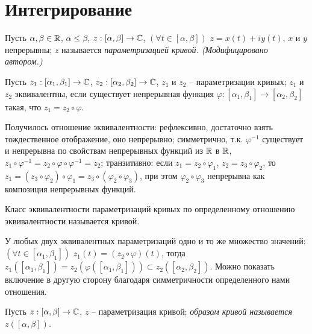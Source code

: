 
\section{Интегрирование}

\begin{definition}
	Пусть $\alpha, \beta \in \mathbb{R}$, $\alpha \leq \beta$, $z: [\alpha, \beta] \to \mathbb{C}$, $(\forall t \in [\alpha, \beta]) \,\, z = x(t) + i y(t)$, $x$ и $y$ непрерывны; $z$ называется \it{параметризацией кривой}. (Модифицировано автором.)
\end{definition}

\begin{definition}
	Пусть $z_1: [\alpha_1, \beta_1] \to \mathbb{C}$, $z_2: [\alpha_2, \beta_2] \to \mathbb{C}$, $z_1$ и $z_2$ -- параметризации кривых; $z_1$ и $z_2$ эквивалентны, если существует непрерывная функция $\varphi: [\alpha_1, \beta_1] \to [\alpha_2, \beta_2]$ такая, что $z_1 = z_2 \circ \varphi$.
\end{definition}

\begin{anote}
	Получилось отношение эквивалентности: рефлексивно, достаточно взять тождественное отображение, оно непрерывно; симметрично, т.к. $\varphi^{-1}$ существует и непрерывна по свойствам непрерывных функций из $\mathbb{R}$ в $\mathbb{R}$, $z_1 \circ \varphi^{-1} = z_2 \circ \varphi \circ \varphi^{-1} = z_2$; транзитивно: если $z_1 = z_2 \circ \varphi_1$, $z_2 = z_3 \circ \varphi_2$, то $z_1 = (z_3 \circ \varphi_2) \circ \varphi_1 = z_3 \circ (\varphi_2 \circ \varphi_3)$, при этом $\varphi_2 \circ \varphi_3$ непрерывна как композиция непрерывных функций.
\end{anote}

\begin{definition}
	Класс эквивалентности параметризаций кривых по определенному отношению эквивалентности называется кривой.
\end{definition}

\begin{anote}
	У любых двух эквивалентных параметризаций одно и то же множество значений: $(\forall t \in [\alpha_1, \beta_1]) \, \, z_1(t) = (z_2 \circ \varphi)(t)$, тогда $z_1([\alpha_1, \beta_1]) = z_2(\varphi([\alpha_1, \beta_1])) \subset z_2([\alpha_2, \beta_2])$. Можно показать включение в другую сторону благодаря симметричности определенного нами отношения.
\end{anote}

\begin{definition}
	Пусть $z: [\alpha, \beta] \to \mathbb{C}$, $z$ -- параметризация кривой; \it{образом кривой} называется $z([\alpha, \beta])$.
\end{definition}
